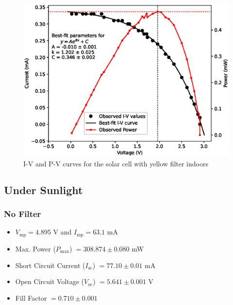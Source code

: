 \begin{figure}[H]
    \centering
    \includegraphics[width=1\columnwidth]{images/in/yellow.eps}
    \caption{I-V and P-V curves for the solar cell with yellow filter indoors}
\end{figure}


\subsection{Under Sunlight}

\subsubsection{No Filter}
\begin{itemize}
    \item $V_\text{mp} = 4.895$ V and $I_\text{mp} = 63.1$ mA
    \item Max. Power ($P_\text{max}$) $= 308.874 \pm 0.080 $ mW
    \item Short Circuit Current ($I_\text{sc}$) $= 77.10 \pm 0.01$ mA
    \item Open Circuit Voltage ($V_\text{oc}$) $= 5.641 \pm 0.001$ V
    \item Fill Factor $= 0.710 \pm 0.001$
\end{itemize}

